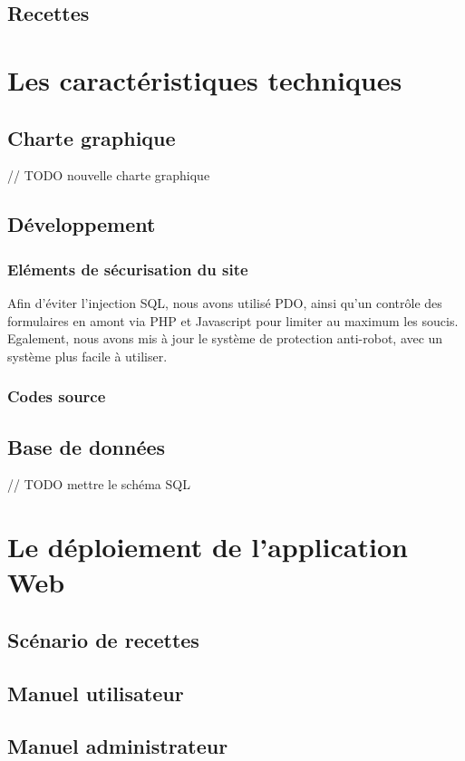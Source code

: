 \documentclass[11pt]{report}
\begin{document}
\section{Recettes}

\chapter{Les caractéristiques techniques}
\section{Charte graphique}
// TODO nouvelle charte graphique
\section{Développement}
\subsection{Eléments de sécurisation du site}
Afin d'éviter l'injection SQL, nous avons utilisé PDO, ainsi qu'un contrôle des
formulaires en amont via PHP et Javascript pour limiter au maximum les soucis.
Egalement, nous avons mis à jour le système de protection anti-robot, avec un
système plus facile à utiliser.
\subsection{Codes source}
\section{Base de données}
// TODO mettre le schéma SQL

\chapter{Le déploiement de l'application Web}
\section{Scénario de recettes}
\section{Manuel utilisateur}
\section{Manuel administrateur}
\end{document}
